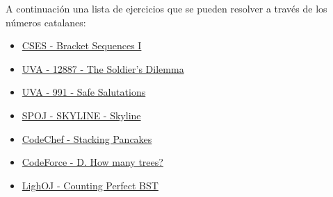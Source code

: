 A continuación una lista de ejercicios que se pueden resolver a través de los números catalanes:

\begin{itemize}
	\item \href{https://cses.fi/problemset/task/2064/}{CSES - Bracket Sequences I}
	\item \href{https://onlinejudge-org.translate.goog/index.php?option=com_onlinejudge&Itemid=8&page=show_problem&problem=4752&_x_tr_sl=en&_x_tr_tl=es&_x_tr_hl=es&_x_tr_pto=wapp}{UVA - 12887 - The Soldier's Dilemma}
	\item \href{https://onlinejudge-org.translate.goog/index.php?option=com_onlinejudge&Itemid=8&page=show_problem&problem=932&_x_tr_sl=en&_x_tr_tl=es&_x_tr_hl=es&_x_tr_pto=wapp}{UVA - 991 - Safe Salutations}
	\item \href{https://www.spoj.com/problems/SKYLINE/}{SPOJ - SKYLINE - Skyline}
	\item \href{https://www.codechef.com/APRIL12/problems/PANSTACK/}{CodeChef - Stacking Pancakes}
	\item \href{https://codeforces.com/problemset/problem/9/D}{CodeForce - D. How many trees?}
	\item \href{https://lightoj.com/problem/counting-perfect-bst}{LighOJ - Counting Perfect BST}
\end{itemize}
